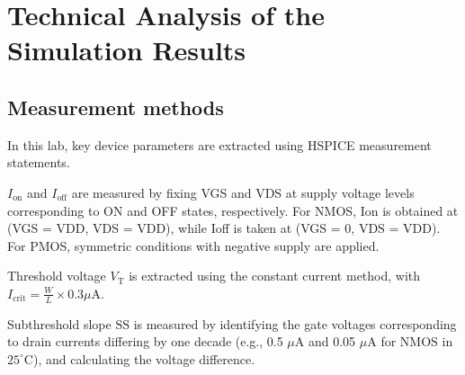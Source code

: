 \documentclass[UTF8,12pt,a4paper]{article}
\begin{document}
\setlength{\arrayrulewidth}{0.9pt} %
\begin{table}[h]
    \centering
    \caption{SS for four transistors at temp = $90^\circ$C}
    \label{SS_temp90}
\end{table}

\newpage
\section{Technical Analysis of the Simulation Results}
\subsection{Measurement methods}
In this lab, key device parameters are extracted using HSPICE measurement statements.

$I_{\text{on}}$ and $I_{\text{off}}$ are measured by fixing VGS and VDS at supply voltage levels corresponding to ON and OFF states, respectively. For NMOS, Ion is obtained at (VGS = VDD, VDS = VDD), while Ioff is taken at (VGS = 0, VDS = VDD). For PMOS, symmetric conditions with negative supply are applied.

Threshold voltage $V_{\text{T}}$ is extracted using the constant current method, with $I_{\text{crit}}=\frac{W}{L}\times 0.3\mu \text{A}$.

Subthreshold slope $\text{SS}$ is measured by identifying the gate voltages corresponding to drain currents differing by one decade (e.g., 0.5 $\mu$A and 0.05 $\mu$A for NMOS in $25^\circ$C), and calculating the voltage difference.
\end{document}
